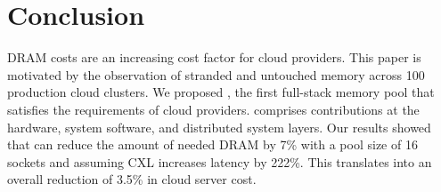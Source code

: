 

\section{Conclusion}

DRAM costs are an increasing cost factor for cloud providers.
This paper is motivated by the observation of stranded and untouched memory across 100 production cloud clusters.
We proposed \sys, the first full-stack memory pool that satisfies the requirements of cloud providers.
\sys
comprises contributions at the hardware, system software, and
distributed system layers.
Our results showed
that \sys can reduce the amount of needed DRAM by 7\% with a pool size of 16 sockets and assuming CXL increases latency by 222\%.
This translates into an overall reduction of 3.5\% in cloud server cost.

